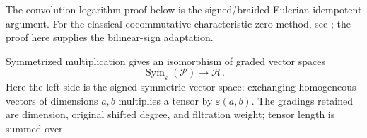 The convolution-logarithm proof below is the signed/braided
Eulerian-idempotent argument.  For the classical cocommutative
characteristic-zero method, see
\cite[Sections~3--4, Theorem~3.5 and Lemma~4.1]{Patras93};
the proof here supplies the bilinear-sign adaptation.

\begin{lemma}\label{alg:pbw}
Symmetrized multiplication gives an isomorphism of graded vector
spaces
\begin{equation}\label{alg:pbw-map}
 \operatorname{Sym}_{\varepsilon}(\mathcal P)
       \longrightarrow\mathcal H.
\end{equation}
Here the left side is the signed symmetric vector space: exchanging
homogeneous vectors of dimensions $a,b$ multiplies a tensor by
$\varepsilon(a,b)$.  The gradings retained are dimension, original
shifted degree, and filtration weight; tensor length is summed over.
\end{lemma}


